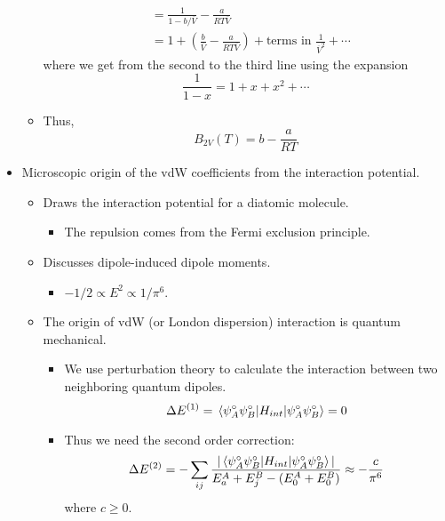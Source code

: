 \documentclass[../notes.tex]{subfiles}
\begin{document}
\begin{itemize}
\begin{itemize}
\begin{align*}
            &= \frac{1}{1-b/\overline{V}}-\frac{a}{RT\overline{V}}\\
            &= 1+\left( \frac{b}{\overline{V}}-\frac{a}{RT\overline{V}} \right)+\text{terms in }\tfrac{1}{\overline{V}^2}+\cdots
        \end{align*}
        where we get from the second to the third line using the expansion
        \begin{equation*}
            \frac{1}{1-x} = 1+x+x^2+\cdots
        \end{equation*}
        \item Thus,
        \begin{equation*}
            B_{2V}(T) = b-\frac{a}{RT}
        \end{equation*}
    \end{itemize}
    \item Microscopic origin of the vdW coefficients from the interaction potential.
    \begin{itemize}
        \item Draws the interaction potential for a diatomic molecule.
        \begin{itemize}
            \item The repulsion comes from the Fermi exclusion principle.
        \end{itemize}
        \item Discusses dipole-induced dipole moments.
        \begin{itemize}
            \item $-1/2\propto E^2\propto 1/\pi^6$.
        \end{itemize}
        \item The origin of vdW (or London dispersion) interaction is quantum mechanical.
        \begin{itemize}
            \item We use perturbation theory to calculate the interaction between two neighboring quantum dipoles.
            \begin{equation*}
                \Delta E^{(1)} = \ev{H_{int}}{\psi_A^\circ\psi_B^\circ} = 0
            \end{equation*}
            \item Thus we need the second order correction:
            \begin{equation*}
                \Delta E^{(2)} = -\sum_{ij}\frac{|\ev{H_{int}}{\psi_A^\circ\psi_B^\circ}|}{E_a^A+E_j^B-(E_0^A+E_0^B)} \approx -\frac{c}{\pi^6}
            \end{equation*}
            where $c\geq 0$.
        \end{itemize}
    \end{itemize}
\end{itemize}
\end{document}

